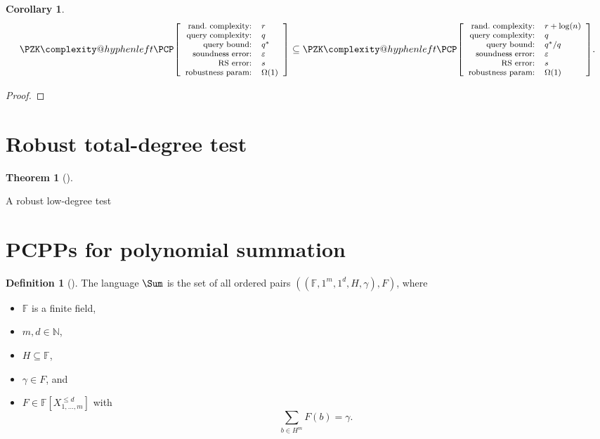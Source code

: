 \documentclass[english,12pt]{reedthesis}
\makeatletter
\theoremstyle{plain}
\newtheorem{thm}{Theorem}[section]
\newtheorem{cor}[cor]{Corollary}
\theoremstyle{definition}
\newtheorem{defn}[defn]{Definition}
\theoremstyle{remark}
\newcommand{\pzkpcpr}[6]{%
  \ensuremath%
  \mleft[{\footnotesize\begin{array}{r l}
    \text{rand.\ complexity:} & #1 \\
    \text{query complexity:} & #2 \\
    \text{query bound:} & #3 \\
    \text{soundness error:} & #4 \\
    \text{RS error:} & #5 \\
    \text{robustness param:} & #6
  \end{array}}\mright]%
}
\newcommand{\PZKPCP}{%
  \PZK\complexity@hyphenleft\PCP
}
\makeatother
\begin{document}
\begin{cor}\label{cor:constant-query}
  \begin{equation}\label{eqn:constant-query}
    \PZKPCP\pzkpcpr{r}{q}{q^{*}}{\varepsilon}{s}{\Omega(1)} \subseteq
    \PZKPCP\pzkpcpr{r + \log(n)}{q}{q^{*}/q}{\varepsilon}{s}{\Omega(1)}.
  \end{equation}
\end{cor}

\begin{proof}
\end{proof}

\section{Robust total-degree test}\label{sec:robust-degree}

\begin{thm}[{\cite[Prop.\ 5.7]{Par21}}]\label{thm:robust-low-deg}
\end{thm}

\begin{algorithm}[htbp]
  \caption{A robust low-degree test~\cite[Prop.\ 5.7]{Par21}}\label{alg:robust-low-deg}
\end{algorithm}

\section{PCPPs for polynomial summation}\label{sec:pcpp-poly-sum}

\begin{defn}[{\cite[Def.\ 4.1]{GOS25}}]\label{def:sum-lang}
  The language $\Sum$ is the set of all ordered pairs
  $((\mathbb{F}, 1^{m}, 1^{d}, H, \gamma), F)$, where
  \begin{itemize}
    \item $\mathbb{F}$ is a finite field,
    \item $m, d \in \mathbb{N}$,
    \item $H \subseteq \mathbb{F}$,
    \item $\gamma \in F$, and
    \item $F \in \mathbb{F}[X_{1, \ldots, m}^{\le d}]$ with
          \[
            \sum_{b \in H^{m}}F(b) = \gamma.
          \]
  \end{itemize}
\end{defn}
\end{document}
